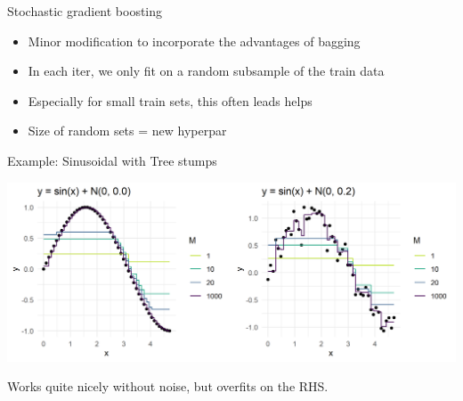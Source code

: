 \documentclass[11pt,compress,t,notes=noshow, xcolor=table]{beamer}
\begin{document}
\begin{vbframe}{Stochastic gradient boosting}

\begin{itemize}
\item Minor modification to incorporate the advantages of bagging
\item In each iter, we only fit on a random subsample of the train data
\item Especially for small train sets, this often leads helps
\item Size of random sets = new hyperpar

\end{itemize}

\end{vbframe}


\begin{vbframe}{Example: Sinusoidal with Tree stumps}



\begin{center}
  \includegraphics[width=\textwidth]{figure/gbm_sine.png}
\end{center}


Works quite nicely without noise, but overfits on the RHS.


\end{vbframe}
\end{document}
